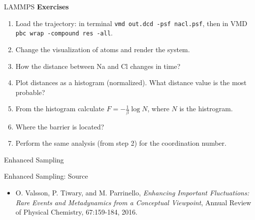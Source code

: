 \documentclass[10pt]{beamer}
\begin{document}
\begin{frame}{LAMMPS}
  \textbf{Exercises}\\[0.2cm]
  \begin{enumerate}
    \setlength\itemsep{1em}
    \item Load the trajectory: in terminal \texttt{vmd out.dcd -psf nacl.psf}, then in VMD \texttt{pbc wrap -compound res -all}.

    \item Change the visualization of atoms and render the system.

    \item How the distance between Na and Cl changes in time?

    \item Plot distances as a histogram (normalized). What distance value is the most probable?

    \item From the histogram calculate $F=-\frac{1}{\beta}\log N$, where $N$ is the histrogram.

    \item Where the barrier is located?

    \item Perform the same analysis (from step 2) for the coordination number.
  \end{enumerate}
\end{frame}


\begin{frame}{}
  \begin{center}
    \fontsize{25pt}{6}\selectfont\vspace{1.2cm}
    \textcolor{subtitle}{Enhanced Sampling}
  \end{center}
\end{frame}

\begin{frame}{Enhanced Sampling: Source}
  \begin{itemize}
  \setlength\itemsep{1em}
    \item O. Valsson, P. Tiwary, and M. Parrinello, \textit{Enhancing Important Fluctuations: Rare Events and Metadynamics from a Conceptual Viewpoint}, Annual Review of Physical Chemistry, 67:159-184, 2016.
  \end{itemize}
\end{frame}
\end{document}
